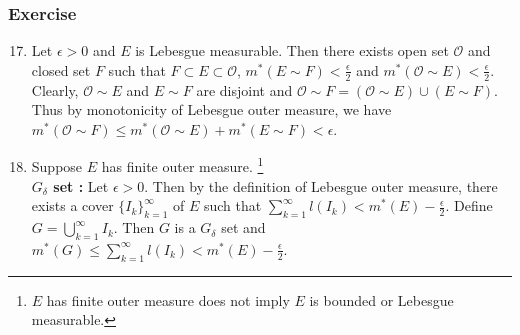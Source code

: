 \subsubsection{Exercise}

\begin{enumerate}
	\setcounter{enumi}{16}
\item Let $\epsilon > 0$ and $E$ is Lebesgue measurable.
	Then there exists open set $\mathcal{O}$ and closed set $F$ such that $F \subset E \subset \mathcal{O}$, $m^\ast(E \sim F) < \frac{\epsilon}{2}$ and $m^\ast(\mathcal{O} \sim E) < \frac{\epsilon}{2}$.
	Clearly, $\mathcal{O} \sim E$ and $E \sim F$ are disjoint and $\mathcal{O} \sim F = (\mathcal{O} \sim E) \cup (E \sim F)$.
		Thus by monotonicity of Lebesgue outer measure, we have $m^\ast(\mathcal{O} \sim F) \le m^\ast(\mathcal{O} \sim E) + m^\ast(E \sim F) < \epsilon$.
\item
 Suppose $E$ has finite outer measure.
	\dag\footnote{
		$E$ has finite outer measure does not imply $E$ is bounded or Lebesgue measurable.}\\
	\textbf{$G_\delta$ set : }
	Let $\epsilon > 0$.
	Then by the definition of Lebesgue outer measure, there exists a cover $\{ I_k \}_{k=1}^\infty$ of $E$ such that $\displaystyle \sum_{k=1}^\infty l(I_k) < m^\ast(E) - \frac{\epsilon}{2}$.
	Define $\displaystyle G = \bigcup_{k=1}^\infty I_k$.
	Then $G$ is a $G_\delta$ set and $\displaystyle m^\ast(G) \le \sum_{k=1}^\infty l(I_k) < m^\ast(E) - \frac{\epsilon}{2}$.\\


\end{enumerate}
